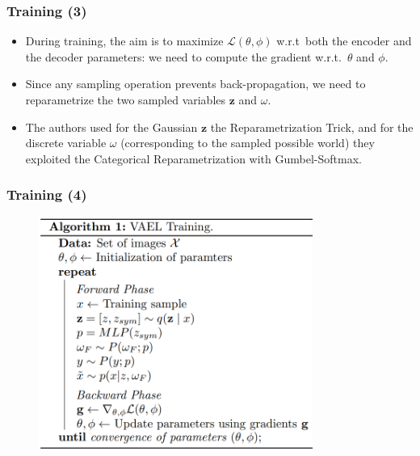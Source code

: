 \documentclass[10pt,xcolor={dvipsnames}]{beamer}
\begin{document}
\begin{frame}
    \frametitle{Training (3)}
    \begin{itemize}
        \item During training, the aim is to maximize $\mathcal{L}(\theta, \phi)$ w.r.t~both the encoder and the decoder parameters: we need to compute the gradient w.r.t.~$\theta$ and $\phi$.
        \item Since any sampling operation prevents back-propagation, we need to reparametrize the two sampled variables $\mathbf{z}$ and $\omega$.
        \item The authors used for the Gaussian $\mathbf{z}$ the Reparametrization Trick, and for the discrete variable $\omega$ (corresponding to the sampled possible world) they exploited the Categorical Reparametrization with Gumbel-Softmax.
    \end{itemize}
\end{frame}


\begin{frame}
    \frametitle{Training (4)}
    \begin{figure}[htb]
        \centering
        \includegraphics[width=0.8\textwidth]{figures/algorithm.png}
    \end{figure}
\end{frame}
\end{document}
